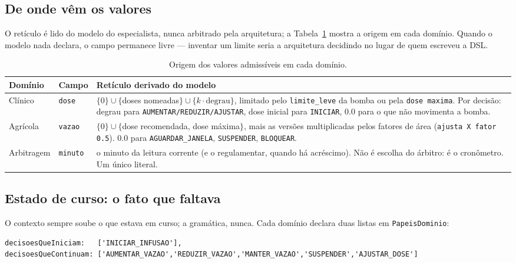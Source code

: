 \documentclass[11pt,a4paper]{article}
\begin{document}
\subsection{De onde vêm os valores}

O retículo é lido do modelo do especialista, nunca arbitrado pela arquitetura;
a Tabela~\ref{tab:valores} mostra a origem em cada domínio.
Quando o modelo nada declara, o campo permanece livre --- inventar um limite
seria a arquitetura decidindo no lugar de quem escreveu a DSL.

\begin{table}[h]
\centering
\small
\caption{Origem dos valores admissíveis em cada domínio.}
\label{tab:valores}
\begin{tabular}{@{}p{2.4cm}p{4.4cm}p{8.0cm}@{}}
\toprule
\textbf{Domínio} & \textbf{Campo} & \textbf{Retículo derivado do modelo} \\
\midrule
Clínico & \texttt{dose} &
$\{0\} \cup \{$doses nomeadas$\} \cup \{k \cdot \text{degrau}\}$, limitado pelo
\texttt{limite\_leve} da bomba ou pela \texttt{dose maxima}. Por decisão:
degrau para \texttt{AUMENTAR/REDUZIR/AJUSTAR}, dose inicial para
\texttt{INICIAR}, $0.0$ para o que não movimenta a bomba. \\
\addlinespace
Agrícola & \texttt{vazao} &
$\{0\} \cup \{$dose recomendada, dose máxima$\}$, mais as versões multiplicadas
pelos fatores de área (\texttt{ajusta X fator 0.5}). $0.0$ para
\texttt{AGUARDAR\_JANELA}, \texttt{SUSPENDER}, \texttt{BLOQUEAR}. \\
\addlinespace
Arbitragem & \texttt{minuto} &
o minuto da leitura corrente (e o regulamentar, quando há acréscimo). Não é
escolha do árbitro: é o cronômetro. Um único literal. \\
\bottomrule
\end{tabular}
\end{table}

\subsection{Estado de curso: o fato que faltava}

O contexto sempre soube o que estava em curso; a gramática, nunca. Cada domínio
declara duas listas em \texttt{PapeisDominio}:

\begin{lstlisting}[language=tsx,caption={Declaração do estado de curso (domínio clínico).}]
decisoesQueIniciam:   ['INICIAR_INFUSAO'],
decisoesQueContinuam: ['AUMENTAR_VAZAO','REDUZIR_VAZAO','MANTER_VAZAO','SUSPENDER','AJUSTAR_DOSE']
\end{lstlisting}
\end{document}

